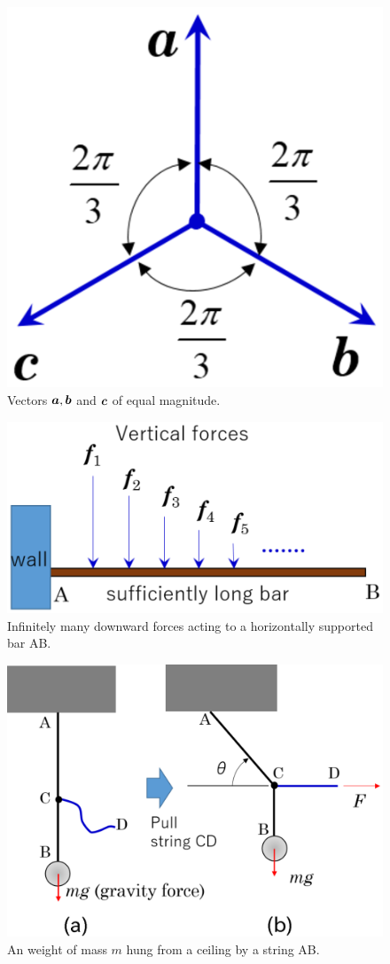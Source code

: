 \documentclass[10pt,a4j]{article}
\begin{document}
\begin{figure}[h]
	\begin{center}
	\includegraphics[width=0.4\linewidth]{fig1_2.eps} 
	\end{center}
	\caption{Vectors $\mbox{\boldmath $a$}, \mbox{\boldmath $b$}$ and $\mbox{\boldmath $c$}$ of equal magnitude.} 
	\label{fig:fig1_2}
\end{figure}
\begin{figure}[h]
	\begin{center}
	\includegraphics[width=0.6\linewidth]{fig1_3.eps} 
	\end{center}
	\caption{Infinitely many downward forces acting to a horizontally supported bar AB.}
	\label{fig:fig1_3}
\end{figure}
\begin{figure}[h]
	\begin{center}
	\includegraphics[width=0.6\linewidth]{fig1_4.eps} 
	\end{center}
	\caption{An weight of mass $m$ hung from a ceiling by a string AB.} 
	\label{fig:fig1_4}
\end{figure}
\end{document}

